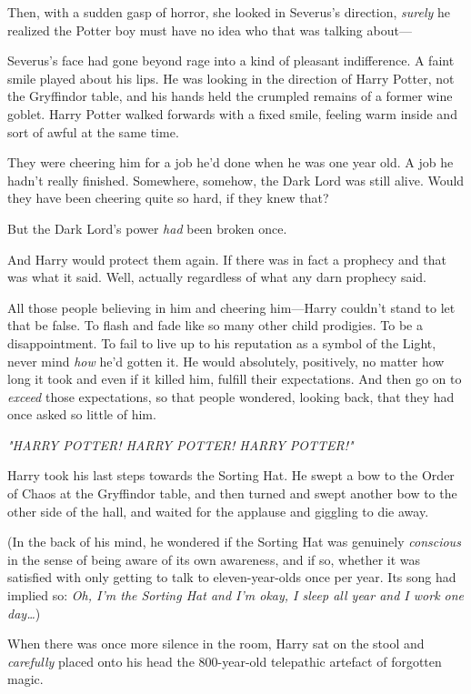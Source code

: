 Then, with a sudden gasp of horror, she looked in Severus's direction, 
\emph{surely} he realized the Potter boy must have no idea who that was talking 
about---

Severus's face had gone beyond rage into a kind of pleasant indifference. A 
faint smile played about his lips. He was looking in the direction of Harry 
Potter, not the Gryffindor table, and his hands held the crumpled remains of a 
former wine goblet.
\sbreak
Harry Potter walked forwards with a fixed smile, feeling warm inside and sort 
of awful at the same time.

They were cheering him for a job he'd done when he was one year old. A job he 
hadn't really finished. Somewhere, somehow, the Dark Lord was still alive. 
Would they have been cheering quite so hard, if they knew that?

But the Dark Lord's power \emph{had} been broken once.

And Harry would protect them again. If there was in fact a prophecy and that 
was what it said. Well, actually regardless of what any darn prophecy said.

All those people believing in him and cheering him---Harry couldn't stand to 
let that be false. To flash and fade like so many other child prodigies. To be 
a disappointment. To fail to live up to his reputation as a symbol of the 
Light, never mind \emph{how} he'd gotten it. He would absolutely, positively, 
no matter how long it took and even if it killed him, fulfill their 
expectations. And then go on to \emph{exceed} those expectations, so that 
people wondered, looking back, that they had once asked so little of him.

\emph{"HARRY POTTER! HARRY POTTER! HARRY POTTER!"}

Harry took his last steps towards the Sorting Hat. He swept a bow to the Order 
of Chaos at the Gryffindor table, and then turned and swept another bow to the 
other side of the hall, and waited for the applause and giggling to die away.

(In the back of his mind, he wondered if the Sorting Hat was genuinely 
\emph{conscious} in the sense of being aware of its own awareness, and if so, 
whether it was satisfied with only getting to talk to eleven-year-olds once per 
year. Its song had implied so: \emph{Oh, I'm the Sorting Hat and I'm okay, I 
sleep all year and I work one day{\ldots}})

When there was once more silence in the room, Harry sat on the stool and 
\emph{carefully} placed onto his head the 800-year-old telepathic artefact of 
forgotten magic.

